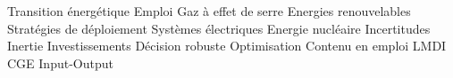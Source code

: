 
\noindent Transition énergétique \quad 
Emploi \quad
Gaz à effet de serre \quad
Energies renouvelables \quad
Stratégies de déploiement \quad
Systèmes électriques \quad
Energie nucléaire \quad
Incertitudes \quad
Inertie \quad
Investissements \quad
Décision robuste \quad
Optimisation \quad
Contenu en emploi \quad
LMDI \quad
CGE \quad
Input-Output \quad


